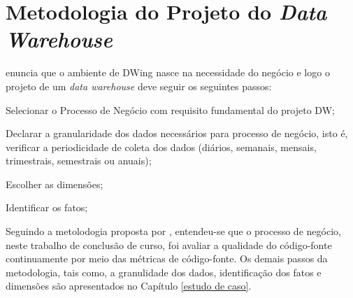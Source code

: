 \section{Metodologia do Projeto do \textit{Data Warehouse}}

 enuncia que o ambiente de DWing nasce na necessidade do negócio e logo o projeto de um \textit{data warehouse} deve seguir os seguintes passos: 

\begin{inparaenum}[1)]
	\item Selecionar o Processo de Negócio com requisito fundamental do 
	projeto DW;
	
	\item Declarar a granularidade dos dados necessários para processo de 
	negócio, isto é, verificar a periodicidade de coleta dos dados (diários, semanais, mensais, trimestrais, semestrais ou anuais);
	
	\item Escolher as dimensões;
	
	\item Identificar os fatos;

\end{inparaenum} 


Seguindo a metolodogia proposta por , entendeu-se que o processo de negócio, neste trabalho de conclusão de curso, foi avaliar a qualidade do código-fonte continuamente por meio das métricas de código-fonte.
Os demais passos da metodologia, tais como, a granulidade dos dados, identificação dos fatos e dimensões são apresentados no Capítulo \ref{estudo de caso}.


